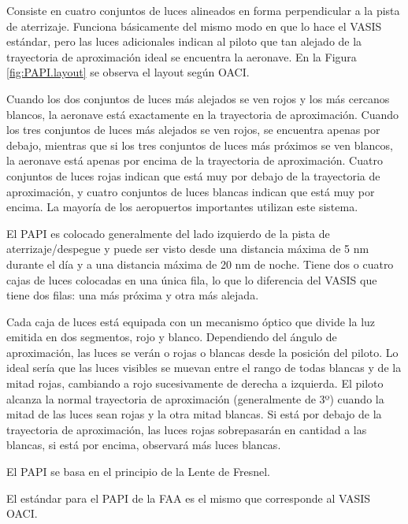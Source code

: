 
Consiste en cuatro conjuntos de luces alineados en forma perpendicular a la pista de aterrizaje.
Funciona básicamente del mismo modo en que lo hace el VASIS estándar, pero las luces adicionales
indican al piloto que tan alejado de la trayectoria de aproximación ideal se encuentra la aeronave.
En la Figura \ref{fig:PAPI.layout} se observa el layout según OACI.

Cuando los dos conjuntos de luces más alejados se ven rojos y los más cercanos blancos,
la aeronave está exactamente en la trayectoria de aproximación.
Cuando los tres conjuntos de luces más
alejados se ven rojos, se encuentra apenas por debajo, mientras que si los tres conjuntos de luces
más próximos se ven blancos, la aeronave está apenas por encima de la trayectoria de aproximación.
Cuatro conjuntos de luces rojas indican que está muy por debajo de la trayectoria de aproximación,
y cuatro conjuntos de luces blancas indican que está muy por encima. La mayoría de los aeropuertos
importantes utilizan este sistema.

El PAPI es colocado generalmente del lado izquierdo de la pista de aterrizaje/despegue y puede
ser visto desde una distancia máxima de 5 nm durante el día y a una distancia máxima de
20 nm de noche. Tiene dos o cuatro cajas de luces colocadas en una única fila, lo que lo
diferencia del VASIS que tiene dos filas: una más próxima y otra más alejada.

Cada caja de luces está equipada con un mecanismo óptico que divide la luz emitida en dos
segmentos, rojo y blanco. Dependiendo del ángulo de aproximación, las luces se verán o rojas o
blancas desde la posición del piloto. Lo ideal sería que las luces visibles se muevan entre el rango de
todas blancas y de la mitad rojas, cambiando a rojo sucesivamente de derecha a izquierda. El piloto
alcanza la normal trayectoria de aproximación (generalmente de 3º) cuando la mitad de las
luces sean rojas y la otra mitad blancas. Si está por debajo de la trayectoria de aproximación, las
luces rojas sobrepasarán en cantidad a las blancas, si está por encima, observará más luces blancas.

El PAPI se basa en el principio de la Lente de Fresnel.

El estándar para el PAPI de la FAA es el mismo que corresponde al VASIS OACI.

